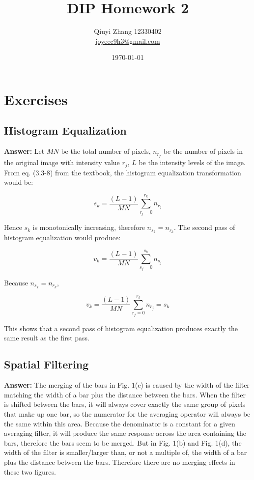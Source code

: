 \documentclass{article}
\begin{document}
\title{DIP Homework 2}
\author{Qiuyi Zhang 12330402 \\ \href{mailto:joyeec9h3@gmail.com}{joyeec9h3@gmail.com}} 
\date{\today}
\maketitle
\tableofcontents
\section{Exercises}

\subsection{Histogram Equalization}

\textbf{Answer:} 
Let $MN$ be the total number of pixels, $n_{r_j}$ be the number of pixels in the original image with intensity value $r_j$, $L$ be the intensity levels of the image. From eq. (3.3-8) from the textbook, the histogram equalization transformation would be:

$$s_k = \frac{(L-1)}{MN}\sum_{r_j=0}^{r_k}n_{r_j}$$

Hence $s_k$ is monotonically increasing, therefore $n_{s_k} = n_{r_k}$. The second pass of histogram equalization would produce:

$$v_k =  \frac{(L-1)}{MN}\sum_{s_j=0}^{s_k}n_{s_j}$$

Because $n_{s_k} = n_{r_k}$, 

$$v_k =  \frac{(L-1)}{MN}\sum_{r_j=0}^{r_k}n_{r_j} = s_k$$

This shows that a second pass of histogram equalization produces exactly the same result as the first pass.

\subsection{Spatial Filtering}

\textbf{Answer:}
The merging of the bars in Fig. 1(c) is caused by the width of the filter matching the width of a bar plus the distance between the bars. When the filter is shifted between the bars, it will always cover exactly the same group of pixels that make up one bar, so the numerator for the averaging operator will always be the same within this area. Because the denominator is a constant for a given averaging filter, it will produce the same response across the area containing the bars, therefore the bars seem to be merged. But in Fig. 1(b) and Fig. 1(d), the width of the filter is smaller/larger than, or not a multiple of, the width of a bar plus the distance between the bars. Therefore there are no merging effects in these two figures.
\end{document}

